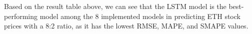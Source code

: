\documentclass{ieeeojies}
\begin{document}
\begin{table}[H]
    \caption{ETH Dataset}
    \label{table:3}
\end{table}
Based on the result table above, we can see that the LSTM model is the best-performing model among the 8 implemented models in predicting ETH stock prices with a 8:2 ratio, as it has the lowest RMSE, MAPE, and SMAPE values.
\end{document}
